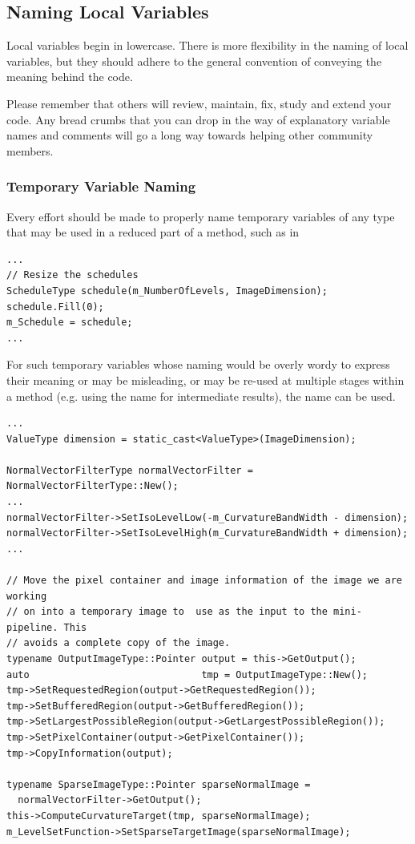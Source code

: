 \subsection{Naming Local Variables}%
\label{subsec:NamingLocalVariables}

Local variables begin in lowercase. There is more flexibility in the naming of
local variables, but they should adhere to the general convention of conveying
the meaning behind the code.

Please remember that others will review, maintain, fix, study and extend your
code. Any bread crumbs that you can drop in the way of explanatory variable
names and comments will go a long way towards helping other community members.


\subsubsection{Temporary Variable Naming}%
\label{subsubsec:TemporaryVariableNaming}

Every effort should be made to properly name temporary variables of any type
that may be used in a reduced part of a method, such as in
\small
\begin{verbatim}
...
// Resize the schedules
ScheduleType schedule(m_NumberOfLevels, ImageDimension);
schedule.Fill(0);
m_Schedule = schedule;
...
\end{verbatim}
\normalsize

For such temporary variables whose naming would be overly wordy to
express their meaning or may be misleading, or may be re-used at multiple
stages within a method (e.g. using the name  for intermediate
results), the name  can be used.
\small
\begin{verbatim}
...
ValueType dimension = static_cast<ValueType>(ImageDimension);

NormalVectorFilterType normalVectorFilter = NormalVectorFilterType::New();
...
normalVectorFilter->SetIsoLevelLow(-m_CurvatureBandWidth - dimension);
normalVectorFilter->SetIsoLevelHigh(m_CurvatureBandWidth + dimension);
...

// Move the pixel container and image information of the image we are working
// on into a temporary image to  use as the input to the mini-pipeline. This
// avoids a complete copy of the image.
typename OutputImageType::Pointer output = this->GetOutput();
auto                              tmp = OutputImageType::New();
tmp->SetRequestedRegion(output->GetRequestedRegion());
tmp->SetBufferedRegion(output->GetBufferedRegion());
tmp->SetLargestPossibleRegion(output->GetLargestPossibleRegion());
tmp->SetPixelContainer(output->GetPixelContainer());
tmp->CopyInformation(output);

typename SparseImageType::Pointer sparseNormalImage =
  normalVectorFilter->GetOutput();
this->ComputeCurvatureTarget(tmp, sparseNormalImage);
m_LevelSetFunction->SetSparseTargetImage(sparseNormalImage);
\end{verbatim}
\normalsize


